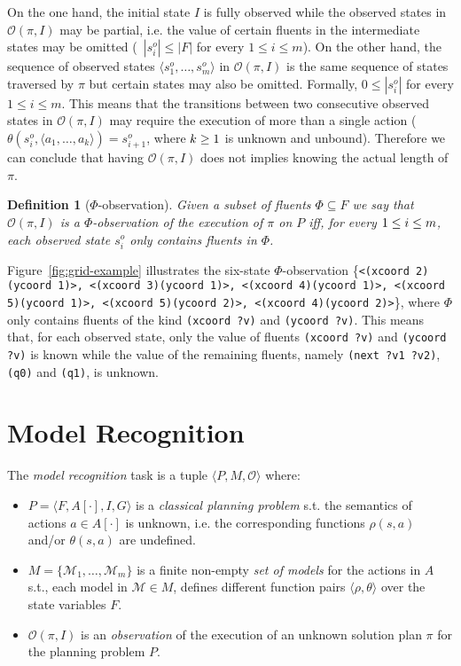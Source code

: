 \documentclass[letterpaper]{article} %
\newcommand{\tup}[1]{{\langle #1 \rangle}}
\newtheorem{definition}[theorem]{Definition}
\begin{document}
On the one hand, the initial state $I$ is fully observed while the observed states in $\mathcal{O}(\pi,I)$ may be partial, i.e. the value of certain fluents in the intermediate states may be omitted (~$|s_i^o|\leq |F|$ for every $1\leq i\leq m$). On the other hand, the sequence of observed states $\tup{s_1^o, \ldots, s_m^o}$ in $\mathcal{O}(\pi,I)$ is the same sequence of states traversed by $\pi$ but certain states may also be omitted. Formally, $0\leq|s_i^o|$ for every $1\leq i\leq m$. This means that the transitions between two consecutive observed states in $\mathcal{O}(\pi,I)$ may require the execution of more than a single action ($\theta(s_i^o,\tup{a_1,\ldots,a_k})=s_{i+1}^o$, where ${\small k\geq 1}$ is unknown and unbound). Therefore we can conclude that having $\mathcal{O}(\pi,I)$ does not implies knowing the actual length of $\pi$.

\begin{definition}[$\Phi$-observation]
Given a subset of fluents $\Phi\subseteq F$ we say that $\mathcal{O}(\pi,I)$ is a $\Phi$-observation of the execution of $\pi$ on $P$ iff, for every ${\small 1\leq i\leq m}$, each observed state $s_i^o$ only contains fluents in $\Phi$.
\end{definition}

Figure~\ref{fig:grid-example} illustrates the six-state $\Phi$-observation \{{\tt\footnotesize<(xcoord 2)(ycoord 1)>, <(xcoord 3)(ycoord 1)>, <(xcoord 4)(ycoord 1)>, <(xcoord 5)(ycoord 1)>, <(xcoord 5)(ycoord 2)>, <(xcoord 4)(ycoord 2)>}\}, where $\Phi$ only contains fluents of the kind {\tt\small (xcoord ?v)} and {\tt\small (ycoord ?v)}. This means that, for each observed state, only the value of fluents {\tt\small (xcoord ?v)} and {\tt\small (ycoord ?v)} is known while the value of the remaining fluents, namely {\tt\small (next ?v1 ?v2)}, {\tt\small (q0)} and {\tt\small (q1)}, is unknown.



\section{Model Recognition}
\label{sec:recognition}
The {\em model recognition} task is a tuple $\tup{P,M,\mathcal{O}}$ where:
\begin{itemize}
\item $P=\tup{F,A[\cdot],I,G}$ is a {\em classical planning problem} s.t. the semantics of actions $a\in A[\cdot]$ is unknown, i.e. the corresponding functions $\rho(s,a)$ and/or $\theta(s,a)$ are undefined.
\item $M=\{\mathcal{M}_1,\ldots,\mathcal{M}_m\}$ is a finite non-empty {\em set of models} for the actions in $A$ s.t., each model in $\mathcal{M}\in M$, defines different function pairs $\tup{\rho,\theta}$ over the state variables $F$.
\item $\mathcal{O}(\pi,I)$ is an {\em observation} of the execution of an unknown solution plan $\pi$ for the planning problem $P$.
\end{itemize}
\end{document}
